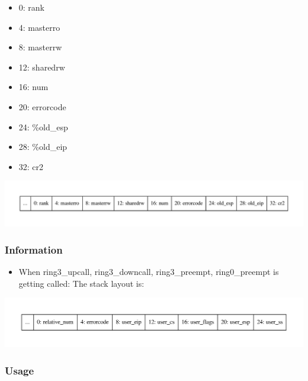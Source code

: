 \documentclass[]{book}
\begin{document}
\begin{itemize}
\begin{itemize}
    \begin{itemize}
    \itemsep1pt\parskip0pt
    \item
      0: rank
    \item
      4: masterro
    \item
      8: masterrw
    \item
      12: sharedrw
    \item
      16: num
    \item
      20: errorcode
    \item
      24: \%old\_esp
    \item
      28: \%old\_eip
    \item
      32: cr2
    \end{itemize}
  \end{itemize}
\end{itemize}

\includegraphics{graphviz-images/d50928bd7002c13646279d8fab8054c249347161.pdf}

\subsubsection*{Information}\label{information-11}

\begin{itemize}
\itemsep1pt\parskip0pt
\item
  When ring3\_upcall, ring3\_downcall, ring3\_preempt, ring0\_preempt is
  getting called: The stack layout is:
\end{itemize}

\includegraphics{graphviz-images/4b94c712fc5d8fc832a722cc09de70139197fc2d.pdf}

\subsubsection*{Usage}\label{usage-11}
\end{document}
